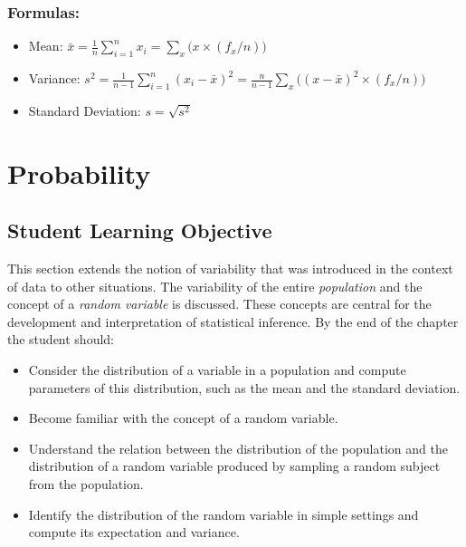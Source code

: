 \documentclass[]{krantz}
\theoremstyle{definition}
\theoremstyle{definition}
\theoremstyle{definition}
\theoremstyle{remark}
\begin{document}
\hypertarget{formulas}{%
\subsection*{Formulas:}\label{formulas}}


\begin{itemize}
\item
  Mean:
  \(\bar x = \frac{1}{n} \sum_{i=1}^n x_i = \sum_x \big(x \times (f_x/n)\big)\)
\item
  Variance:
  \(s^2 = \frac{1}{n-1}\sum_{i=1}^n (x_i - \bar x)^2 = \frac{n}{n-1}\sum_x \big((x - \bar x)^2\times (f_x/n)\big)\)
\item
  Standard Deviation: \(s = \sqrt{s^2}\)
\end{itemize}

\hypertarget{ChapProbability}{%
\chapter{Probability}\label{ChapProbability}}

\hypertarget{student-learning-objective}{%
\section{Student Learning Objective}\label{student-learning-objective}}

This section extends the notion of variability that was introduced in
the context of data to other situations. The variability of the entire
\emph{population} and the concept of a \emph{random variable} is discussed. These
concepts are central for the development and interpretation of
statistical inference. By the end of the chapter the student should:

\begin{itemize}
\item
  Consider the distribution of a variable in a population and compute
  parameters of this distribution, such as the mean and the standard
  deviation.
\item
  Become familiar with the concept of a random variable.
\item
  Understand the relation between the distribution of the population
  and the distribution of a random variable produced by sampling a
  random subject from the population.
\item
  Identify the distribution of the random variable in simple settings
  and compute its expectation and variance.
\end{itemize}
\end{document}
